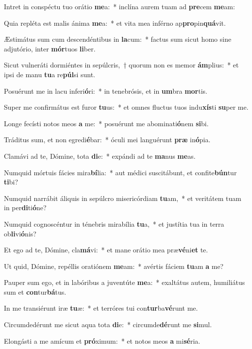 \item Intret in conspéctu tuo orátio \textbf{me}a:~* inclína aurem tuam ad \textbf{pre}cem \textbf{me}am:
\item Quia repléta est malis ánima \textbf{me}a:~* et vita mea inférno ap\textbf{pro}pin\textbf{quá}vit.
\item Æstimátus sum cum descendéntibus in \textbf{la}cum:~* factus sum sicut homo sine adjutório, inter \textbf{mór}tuos \textbf{li}ber.
\item Sicut vulneráti dormiéntes in sepúlcris,~† quorum non es memor \textbf{ám}plius:~* et ipsi de manu \textbf{tu}a re\textbf{púl}si sunt.
\item Posuérunt me in lacu inferi\textbf{ó}ri:~* in tenebrósis, et in \textbf{um}bra \textbf{mor}tis.
\item Super me confirmátus est furor \textbf{tu}us:~* et omnes fluctus tuos indu\textbf{xís}ti \textbf{su}per me.
\item Longe fecísti notos meos \textbf{a} me:~* posuérunt me abominati\textbf{ó}nem \textbf{si}bi.
\item Tráditus sum, et non egredi\textbf{é}bar:~* óculi mei languérunt \textbf{præ} in\textbf{ó}pia.
\item Clamávi ad te, Dómine, tota \textbf{di}e:~* expándi ad te \textbf{ma}nus \textbf{me}as.
\item Numquid mórtuis fácies mira\textbf{bí}lia:~* aut médici suscitábunt, et confite\textbf{bún}tur \textbf{ti}bi?
\item Numquid narrábit áliquis in sepúlcro misericórdiam \textbf{tu}am,~* et veritátem tuam in per\textbf{di}ti\textbf{ó}ne?
\item Numquid cognoscéntur in ténebris mirabília \textbf{tu}a,~* et justítia tua in terra ob\textbf{li}vi\textbf{ó}nis?
\item Et ego ad te, Dómine, cla\textbf{má}vi:~* et mane orátio mea præ\textbf{vé}ni\textbf{et} te.
\item Ut quid, Dómine, repéllis oratiónem \textbf{me}am:~* avértis fáciem \textbf{tu}am \textbf{a} me?
\item Pauper sum ego, et in labóribus a juventúte \textbf{me}a:~* exaltátus autem, humiliátus sum et \textbf{con}tur\textbf{bá}tus.
\item In me transiérunt iræ \textbf{tu}æ:~* et terróres tui con\textbf{tur}ba\textbf{vé}runt me.
\item Circumdedérunt me sicut aqua tota \textbf{di}e:~* circumde\textbf{dé}runt me \textbf{si}mul.
\item Elongásti a me amícum et \textbf{pró}ximum:~* et notos meos \textbf{a} mi\textbf{sé}ria.
